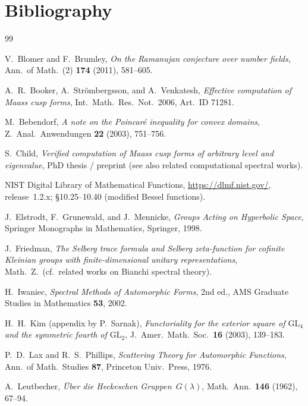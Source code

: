 \documentclass[11pt]{amsart}
\theoremstyle{definition}
\begin{document}
\section{Bibliography}
\begin{thebibliography}{99}

V.~Blomer and F.~Brumley,
\emph{On the Ramanujan conjecture over number fields},
Ann.\ of Math.\ (2) \textbf{174} (2011), 581--605.

A.~R.~Booker, A.~Str\"ombergsson, and A.~Venkatesh,
\emph{Effective computation of Maass cusp forms},
Int.\ Math.\ Res.\ Not.\ 2006, Art.\ ID 71281.

M.~Bebendorf,
\emph{A note on the Poincar\'e inequality for convex domains},
Z.\ Anal.\ Anwendungen \textbf{22} (2003), 751--756.

S.~Child,
\emph{Verified computation of Maass cusp forms of arbitrary level and
eigenvalue},
PhD thesis / preprint (see also related computational spectral works).

NIST Digital Library of Mathematical Functions,
\url{https://dlmf.nist.gov/},
release~1.2.x; \S10.25--10.40 (modified Bessel functions).

J.~Elstrodt, F.~Grunewald, and J.~Mennicke,
\emph{Groups Acting on Hyperbolic Space},
Springer Monographs in Mathematics, Springer, 1998.

J.~Friedman,
\emph{The Selberg trace formula and Selberg zeta-function for
cofinite Kleinian groups with finite-dimensional unitary representations},
Math.\ Z.\ (cf.\ related works on Bianchi spectral theory).

H.~Iwaniec,
\emph{Spectral Methods of Automorphic Forms},
2nd ed., AMS Graduate Studies in Mathematics \textbf{53}, 2002.

H.~H.~Kim (appendix by P.~Sarnak),
\emph{Functoriality for the exterior square of $\mathrm{GL}_4$ and the
symmetric fourth of $\mathrm{GL}_2$},
J.\ Amer.\ Math.\ Soc.\ \textbf{16} (2003), 139--183.

P.~D.~Lax and R.~S.~Phillips,
\emph{Scattering Theory for Automorphic Functions},
Ann.\ of Math.\ Studies \textbf{87}, Princeton Univ.\ Press, 1976.

A.~Leutbecher,
\emph{\"Uber die Heckeschen Gruppen~$G(\lambda)$},
Math.\ Ann.\ \textbf{146} (1962), 67--94.


\end{thebibliography}
\end{document}
